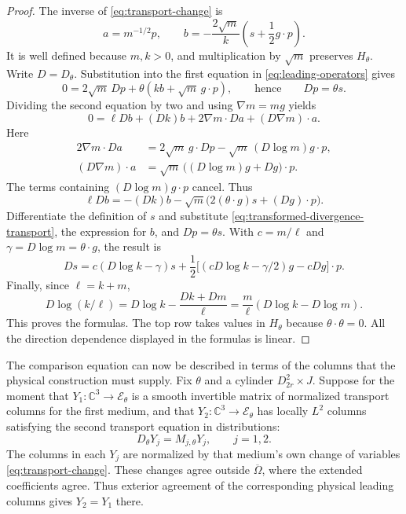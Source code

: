 \documentclass[11pt]{article}
\newcommand{\C}{\mathbb C}
\newcommand{\Ecal}{\mathcal E}
\theoremstyle{remark}
\numberwithin{equation}{section}
\begin{document}
\begin{proof}
The inverse of \eqref{eq:transport-change} is
\[
 a=m^{-1/2}p,
 \qquad
 b=-\frac{2\sqrt m}{k}\left(s+\frac12g\cdot p\right).
\]
It is well defined because $m,k>0$, and multiplication by $\sqrt m$
preserves $H_\theta$. Write $D=D_\theta$. Substitution into the first
equation in \eqref{eq:leading-operators} gives
\[
 0=2\sqrt m\,Dp+\theta(kb+\sqrt m\,g\cdot p),
 \qquad\text{hence}\qquad Dp=\theta s.
\]
Dividing the second equation by two and using
$\nabla m=mg$ yields
\[
 0=\ell Db+(Dk)b+2\nabla m\cdot Da+(D\nabla m)\cdot a.
\]
Here
\[
 \begin{aligned}
 2\nabla m\cdot Da
   &=2\sqrt m\,g\cdot Dp
     -\sqrt m\,(D\log m)g\cdot p,\\
 (D\nabla m)\cdot a
   &=\sqrt m\,\bigl((D\log m)g+Dg\bigr)\cdot p.
 \end{aligned}
\]
The terms containing $(D\log m)g\cdot p$ cancel. Thus
\begin{equation}\label{eq:transformed-divergence-transport}
 \ell Db=-(Dk)b
   -\sqrt m\bigl(2(\theta\cdot g)s+(Dg)\cdot p\bigr).
\end{equation}
Differentiate the definition of $s$ and substitute
\eqref{eq:transformed-divergence-transport}, the expression for $b$,
and $Dp=\theta s$. With $c=m/\ell$ and $\gamma=D\log m=\theta\cdot g$,
the result is
\[
 Ds=c(D\log k-\gamma)s
   +\frac12\bigl[(cD\log k-\gamma/2)g-cDg\bigr]\cdot p.
\]
Finally, since $\ell=k+m$,
\[
 D\log(k/\ell)
 =D\log k-\frac{Dk+Dm}{\ell}
 =\frac m\ell(D\log k-D\log m).
\]
This proves the formulas. The top row takes values in $H_\theta$
because $\theta\cdot\theta=0$. All the direction dependence displayed
in the formulas is linear.
\end{proof}

The comparison equation can now be described in terms of the columns
that the physical construction must supply. Fix $\theta$ and a cylinder
$D_{2r}^2\times J$. Suppose for the moment that
$Y_1:\C^3\to\Ecal_\theta$ is a smooth invertible matrix of normalized
transport columns for the first medium, and that
$Y_2:\C^3\to\Ecal_\theta$ has locally $L^2$ columns satisfying the
second transport equation in distributions:
\[
 D_\theta Y_j=M_{j,\theta}Y_j,\qquad j=1,2.
\]
The columns in each $Y_j$ are normalized by that medium's own change
of variables \eqref{eq:transport-change}. These changes agree outside
$\overline\Omega$, where the extended coefficients agree. Thus exterior
agreement of the corresponding physical leading columns gives
$Y_2=Y_1$ there.
\end{document}
